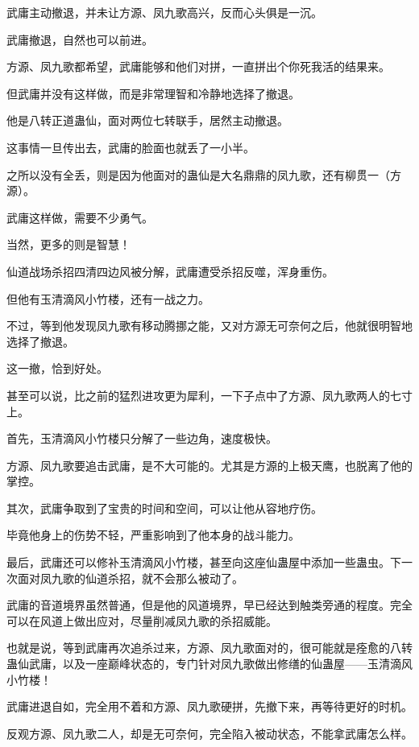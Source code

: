 
\begin{this_body}

武庸主动撤退，并未让方源、凤九歌高兴，反而心头俱是一沉。

武庸撤退，自然也可以前进。

方源、凤九歌都希望，武庸能够和他们对拼，一直拼出个你死我活的结果来。

但武庸并没有这样做，而是非常理智和冷静地选择了撤退。

他是八转正道蛊仙，面对两位七转联手，居然主动撤退。

这事情一旦传出去，武庸的脸面也就丢了一小半。

之所以没有全丢，则是因为他面对的蛊仙是大名鼎鼎的凤九歌，还有柳贯一（方源）。

武庸这样做，需要不少勇气。

当然，更多的则是智慧！

仙道战场杀招四清四边风被分解，武庸遭受杀招反噬，浑身重伤。

但他有玉清滴风小竹楼，还有一战之力。

不过，等到他发现凤九歌有移动腾挪之能，又对方源无可奈何之后，他就很明智地选择了撤退。

这一撤，恰到好处。

甚至可以说，比之前的猛烈进攻更为犀利，一下子点中了方源、凤九歌两人的七寸上。

首先，玉清滴风小竹楼只分解了一些边角，速度极快。

方源、凤九歌要追击武庸，是不大可能的。尤其是方源的上极天鹰，也脱离了他的掌控。

其次，武庸争取到了宝贵的时间和空间，可以让他从容地疗伤。

毕竟他身上的伤势不轻，严重影响到了他本身的战斗能力。

最后，武庸还可以修补玉清滴风小竹楼，甚至向这座仙蛊屋中添加一些蛊虫。下一次面对凤九歌的仙道杀招，就不会那么被动了。

武庸的音道境界虽然普通，但是他的风道境界，早已经达到触类旁通的程度。完全可以在风道上做出应对，尽量削减凤九歌的杀招威能。

也就是说，等到武庸再次追杀过来，方源、凤九歌面对的，很可能就是痊愈的八转蛊仙武庸，以及一座巅峰状态的，专门针对凤九歌做出修缮的仙蛊屋——玉清滴风小竹楼！

武庸进退自如，完全用不着和方源、凤九歌硬拼，先撤下来，再等待更好的时机。

反观方源、凤九歌二人，却是无可奈何，完全陷入被动状态，不能拿武庸怎么样。


\end{this_body}
